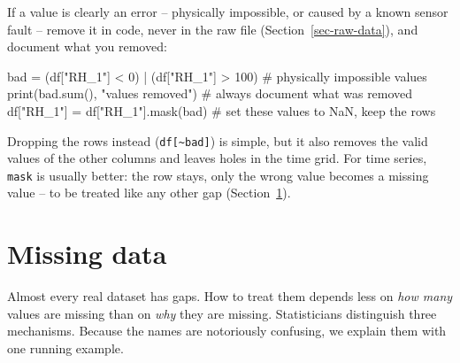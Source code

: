 \documentclass[
  letterpaper,
  DIV=11,
  numbers=noendperiod]{scrreprt}
\newenvironment{Shaded}{\begin{snugshade}}{\end{snugshade}}
\newcommand{\BuiltInTok}[1]{\textcolor[rgb]{0.00,0.23,0.31}{#1}}
\newcommand{\CommentTok}[1]{\textcolor[rgb]{0.37,0.37,0.37}{#1}}
\newcommand{\DecValTok}[1]{\textcolor[rgb]{0.68,0.00,0.00}{#1}}
\newcommand{\NormalTok}[1]{\textcolor[rgb]{0.00,0.23,0.31}{#1}}
\newcommand{\OperatorTok}[1]{\textcolor[rgb]{0.37,0.37,0.37}{#1}}
\newcommand{\StringTok}[1]{\textcolor[rgb]{0.13,0.47,0.30}{#1}}
\begin{document}
\begin{tcolorbox}[enhanced jigsaw, left=2mm, title=\textcolor{quarto-callout-tip-color}{\faLightbulb}\hspace{0.5em}{Engineering practice: removing values that are errors}, opacityback=0, breakable, rightrule=.15mm, arc=.35mm, toptitle=1mm, colbacktitle=quarto-callout-tip-color!10!white, opacitybacktitle=0.6, coltitle=black, colframe=quarto-callout-tip-color-frame, bottomrule=.15mm, leftrule=.75mm, bottomtitle=1mm, titlerule=0mm, toprule=.15mm, colback=white]

If a value is clearly an error -- physically impossible, or caused by a
known sensor fault -- remove it in code, never in the raw file
(Section~\ref{sec-raw-data}), and document what you removed:

\begin{Shaded}
\begin{Highlighting}[]
\NormalTok{bad }\OperatorTok{=}\NormalTok{ (df[}\StringTok{"RH\_1"}\NormalTok{] }\OperatorTok{\textless{}} \DecValTok{0}\NormalTok{) }\OperatorTok{|}\NormalTok{ (df[}\StringTok{"RH\_1"}\NormalTok{] }\OperatorTok{\textgreater{}} \DecValTok{100}\NormalTok{)       }\CommentTok{\# physically impossible values}
\BuiltInTok{print}\NormalTok{(bad.}\BuiltInTok{sum}\NormalTok{(), }\StringTok{"values removed"}\NormalTok{)                 }\CommentTok{\# always document what was removed}
\NormalTok{df[}\StringTok{"RH\_1"}\NormalTok{] }\OperatorTok{=}\NormalTok{ df[}\StringTok{"RH\_1"}\NormalTok{].mask(bad)                  }\CommentTok{\# set these values to NaN, keep the rows}
\end{Highlighting}
\end{Shaded}

Dropping the rows instead (\texttt{df{[}\textasciitilde{}bad{]}}) is
simple, but it also removes the valid values of the other columns and
leaves holes in the time grid. For time series, \texttt{mask} is usually
better: the row stays, only the wrong value becomes a missing value --
to be treated like any other gap (Section~\ref{sec-missing-data}).

\end{tcolorbox}

\section{Missing data}\label{sec-missing-data}

Almost every real dataset has gaps. How to treat them depends less on
\emph{how many} values are missing than on \emph{why} they are missing.
Statisticians distinguish three mechanisms. Because the names are
notoriously confusing, we explain them with one running example.
\end{document}
